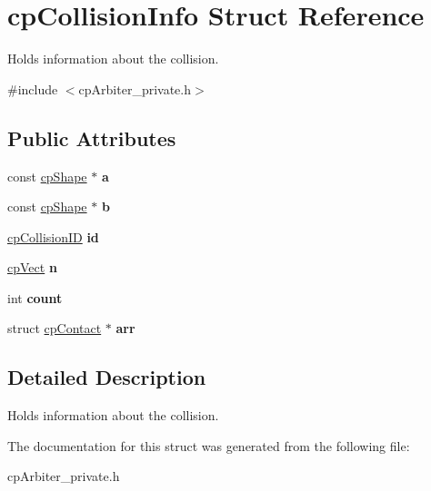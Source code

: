 \hypertarget{structcp_collision_info}{}\section{cp\+Collision\+Info Struct Reference}
\label{structcp_collision_info}


Holds information about the collision.  




{\ttfamily \#include $<$cp\+Arbiter\+\_\+private.\+h$>$}

\subsection*{Public Attributes}
\begin{DoxyCompactItemize}
\item 
\hypertarget{structcp_collision_info_ab48e25f52fb336fe3fb0dabc902db83f}{}const \hyperlink{structcp_shape}{cp\+Shape} $\ast$ {\bfseries a}\label{structcp_collision_info_ab48e25f52fb336fe3fb0dabc902db83f}

\item 
\hypertarget{structcp_collision_info_a28a567040d58ab040e586ecfb96b9267}{}const \hyperlink{structcp_shape}{cp\+Shape} $\ast$ {\bfseries b}\label{structcp_collision_info_a28a567040d58ab040e586ecfb96b9267}

\item 
\hypertarget{structcp_collision_info_ae21c13411c400292c7f3f00e7a73b6c0}{}\hyperlink{group__basic_types_ga89d4043ca0567e947aaca19cf9600df5}{cp\+Collision\+I\+D} {\bfseries id}\label{structcp_collision_info_ae21c13411c400292c7f3f00e7a73b6c0}

\item 
\hypertarget{structcp_collision_info_aa8410869c111353cf2f33467fe4d2769}{}\hyperlink{structcp_vect}{cp\+Vect} {\bfseries n}\label{structcp_collision_info_aa8410869c111353cf2f33467fe4d2769}

\item 
\hypertarget{structcp_collision_info_a3f57f91fb6890a08d00b75522a042153}{}int {\bfseries count}\label{structcp_collision_info_a3f57f91fb6890a08d00b75522a042153}

\item 
\hypertarget{structcp_collision_info_a00b37d34592703cedabc98198de1db5f}{}struct \hyperlink{structcp_contact}{cp\+Contact} $\ast$ {\bfseries arr}\label{structcp_collision_info_a00b37d34592703cedabc98198de1db5f}

\end{DoxyCompactItemize}


\subsection{Detailed Description}
Holds information about the collision. 

The documentation for this struct was generated from the following file\+:\begin{DoxyCompactItemize}
\item 
cp\+Arbiter\+\_\+private.\+h\end{DoxyCompactItemize}
